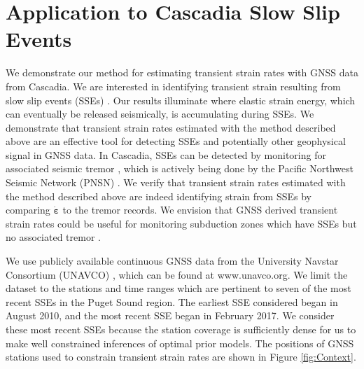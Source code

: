 \documentclass[10pt,letter]{article}
\begin{document}
\section{Application to Cascadia Slow Slip Events}\label{sec:Cascadia}
We demonstrate our method for estimating transient strain rates with GNSS data from Cascadia. We are interested in identifying transient strain resulting from slow slip events (SSEs) \citep[e.g.,][]{Dragert2001}. Our results illuminate where elastic strain energy, which can eventually be released seismically, is accumulating during SSEs. We demonstrate that transient strain rates estimated with the method described above are an effective tool for detecting SSEs and potentially other geophysical signal in GNSS data.  In Cascadia, SSEs can be detected by monitoring for associated seismic tremor \citep{Rogers2003}, which is actively being done by the Pacific Northwest Seismic Network (PNSN) \citep{Wech2010}. We verify that transient strain rates estimated with the method described above are indeed identifying strain from SSEs by comparing $\dot{\bm{\varepsilon}}$ to the tremor records.  We envision that GNSS derived transient strain rates could be useful for monitoring subduction zones which have SSEs but no associated tremor \citep{Schwartz2007}.

We use publicly available continuous GNSS data from the University Navstar Consortium (UNAVCO) \citep{Herring2016}, which can be found at www.unavco.org. We limit the dataset to the stations and time ranges which are pertinent to seven of the most recent SSEs in the Puget Sound region. The earliest SSE considered began in August 2010, and the most recent SSE began in February 2017. We consider these most recent SSEs because the station coverage is sufficiently dense for us to make well constrained inferences of optimal prior models.  The positions of GNSS stations used to constrain transient strain rates are shown in Figure \ref{fig:Context}.  
\end{document}
